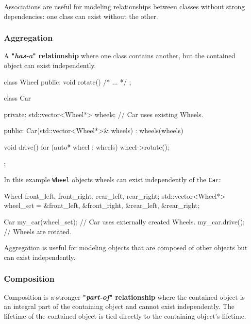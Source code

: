 \vspace{-0.5em}

Associations are useful for modeling relationships between classes without strong dependencies: one class can exist without the other.

\vspace{-0.5em}

\subsubsection{Aggregation}

A \textbf{"\textit{has-a}" relationship} where one class contains another, but the contained object can exist independently.

\begin{codeblock}[language=C++, numbers=none]
class Wheel {
public:
    void rotate() { /* ... */ }
};

class Car {
private:
    std::vector<Wheel*> wheels; // Car uses existing Wheels.

public:
    Car(std::vector<Wheel*>& wheels) : wheels(wheels) {}

    void drive() {
        for (auto* wheel : wheels) {
            wheel->rotate();
        }
    }
};
\end{codeblock}

In this example \texttt{Wheel} objects wheels can exist independently of the \texttt{Car}:

\begin{codeblock}[language=C++]
    Wheel front_left, front_right, rear_left, rear_right;
    std::vector<Wheel*> wheel_set = {&front_left, &front_right, &rear_left, &rear_right};
    
    Car my_car(wheel_set); // Car uses externally created Wheels.
    my_car.drive(); // Wheels are rotated.
\end{codeblock}

Aggregation is useful for modeling objects that are composed of other objects but can exist independently.

\subsubsection{Composition}

Composition is a stronger \textbf{"\textit{part-of}" relationship} where the contained object is an integral part of the containing object and cannot exist independently. The lifetime of the contained object is tied directly to the containing object's lifetime.

